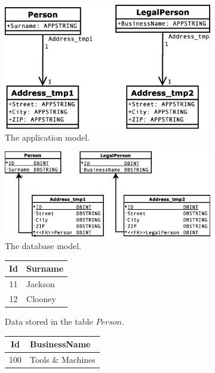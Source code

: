\documentclass[11pt]{article}
\begin{document}
\begin{figure}
\begin{subfigure}[b]{0.5\textwidth}
	\includegraphics[width=\textwidth]{./images/case_app_5}
	\caption{The application model.}
\end{subfigure}
\begin{subfigure}[b]{0.5\textwidth}
	\includegraphics[width=\textwidth]{./images/case_db_5}
	\caption{The database model.}
\end{subfigure}
\begin{subfigure}[b]{0.5\textwidth}
	\centering
	\begin{tabular}{| c | l |}
	 	\hline
		Id &  Surname \\ \hline  
		11 & Jackson  \\ \hline
		12 & Clooney  \\ \hline
	\end{tabular}
	\caption{Data stored in the table $Person$.}
\end{subfigure}
\begin{subfigure}[b]{0.5\textwidth}
	\centering
	\begin{tabular}{| c | l |}
	 	\hline
		Id &  BusinessName  \\ \hline  
		100 & Tools \& Machines  \\ \hline

\end{tabular}
\end{subfigure}
\end{figure}
\end{document}
